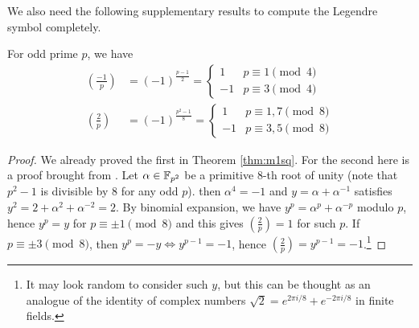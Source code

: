 We also need the following supplementary results to compute the Legendre symbol completely.
\begin{theorem}
    \label{thm:quadratic-reciprocity-supplementary}
    For odd prime $p$, we have
    \begin{align*}
        \left(\frac{-1}{p}\right) &= (-1)^{\frac{p - 1}{2}} = \begin{cases} 1 & p \equiv 1 \pmod{4} \\ -1 & p \equiv 3 \pmod{4} \end{cases} \\
        \left(\frac{2}{p}\right) &= (-1)^{\frac{p^2 - 1}{8}} = \begin{cases}
            1 & p \equiv 1, 7 \pmod{8} \\
            -1 & p \equiv 3, 5 \pmod{8}
        \end{cases}
    \end{align*}
\end{theorem}
\begin{proof}
    We already proved the first in Theorem \ref{thm:m1sq}.
    For the second here is a proof brought from \cite[Theorem]{serre2012course}.
    Let $\alpha \in \mathbb{F}_{p^2}$ be a primitive $8$-th root of unity (note that $p^2 - 1$ is divisible by $8$ for any odd $p$).
    then $\alpha^4 = -1$ and $y = \alpha + \alpha^{-1}$ satisfies $y^2 = 2 + \alpha^2 + \alpha^{-2} = 2$.
    By binomial expansion, we have $y^p = \alpha^p + \alpha^{-p}$ modulo $p$, hence $y^p = y$ for $p \equiv \pm 1\pmod{8}$ and this gives $\left(\frac{2}{p}\right) = 1$ for such $p$.
    If $p \equiv \pm 3 \pmod{8}$, then $y^p = -y \Leftrightarrow y^{p-1} = -1$, hence $\left(\frac{2}{p}\right) = y^{p-1} = -1$.\footnote{It may look random to consider such $y$, but this can be thought as an analogue of the identity of complex numbers $\sqrt{2} = e^{2\pi i / 8} + e^{-2 \pi i / 8}$ in finite fields.}
\end{proof}

